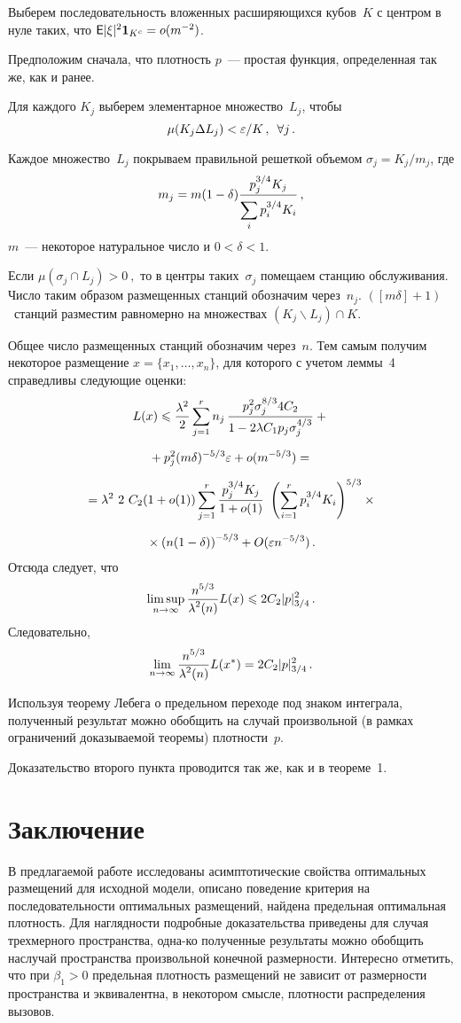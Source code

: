 \begin{multicols}{2}
Выберем последовательность вложенных расширяющихся кубов~$K$ с центром в нуле таких, что
${{\sf E}}|\xi|^2 \mathbf{1}_{K^c}=o(m^{-2})$.

Предположим сначала, что плотность $p$~--- прос\-тая функция, определенная так же, как и ранее.

Для каждого $K_j$ выберем элементарное множество~$L_j$, чтобы
$$
\mu(K_j \Delta L_j)<\varepsilon/K\,,\enskip \forall j\,.
$$

Каждое множество~$L_j$ покрываем правильной решеткой объемом
$\sigma_j=K_j/m_j$, где
$$
m_j=m(1-\delta) \displaystyle\frac{\displaystyle p_j^{3/4}K_j\mathstrut}{\displaystyle \sum\limits_{i}^{} p_i^{3/4}K_i\mathstrut}\,,
$$
$m$~--- некоторое натуральное число и $0<\delta<1$.

Если $\mu(\sigma_j\cap L_j)>0~,$ то в центры таких~$\sigma_j$ помещаем станцию
обслуживания. Число таким образом размещенных станций обозначим через~$n_j$. 
$([m\delta]+1)$~станций разместим равномерно на множествах $(K_j\backslash L_j)\cap K$.

Общее число размещенных станций обозначим через~$n$. Тем самым получим некоторое размещение
$x=\{x_1,\ldots,x_n\}$, для которого с учетом леммы~4 справедливы следующие оценки:
\begin{multline*}
L(x)\leqslant \displaystyle\frac{\displaystyle \lambda^2\mathstrut}{\displaystyle 2\mathstrut} \sum\limits_{j=1}^{r} n_j\, \displaystyle\frac{\displaystyle p_j^2 \sigma_j^{8/3} 4C_2\mathstrut}{\displaystyle 1-2\lambda C_1 p_j \sigma_j^{4/3}\mathstrut}+{}\\[6pt]
{}+ p_j^2 (m \delta)^{-5/3} \varepsilon +o(m^{-5/3}) ={}\\[6pt]
{}
=\lambda^2~ 2~ C_2(1+o(1))\sum\limits_{j=1}^{r} \displaystyle\frac{\displaystyle p_j^{3/4} K_j \mathstrut}{\displaystyle 1+o(1)\mathstrut}~
\left(\sum\limits_{i=1}^{r} p_i^{3/4} K_i\right)^{5/3}\times{}\\[6pt]
{}\times \left(n(1-\delta)\right)^{-5/3}+O(\varepsilon n^{-5/3})\,.
\end{multline*}
Отсюда следует, что
$$
\limsup\limits_{n \to \infty}\displaystyle\frac{\displaystyle n^{5/3}\mathstrut}{\displaystyle \lambda^2(n)\mathstrut}L(x)\leqslant 2C_2|p|_{3/4}^2\,.
$$
Следовательно,
$$
\lim\limits_{n\to\infty}\displaystyle\frac{\displaystyle n^{5/3}\mathstrut}{\displaystyle \lambda^2(n)\mathstrut}L(x^*)=2C_2|p|_{3/4}^2\,.
$$

Используя теорему Лебега о предельном переходе под знаком интеграла, 
полученный результат можно обобщить на случай произвольной (в рамках 
ограничений доказываемой теоремы) плотности~$p$.

Доказательство второго пункта проводится так же, как и в теореме~1.

\section{Заключение}

В предлагаемой работе исследованы асимптотические свойства оптимальных 
размещений для исходной модели, описано поведение критерия на последовательности 
оптимальных размещений, найдена предельная оптимальная плотность. Для наглядности 
подробные доказательства приведены для случая трехмерного пространства, одна-\linebreak ко 
полученные результаты можно обобщить на\linebreak случай пространства произвольной конечной 
раз\-мер\-ности. Интересно отметить, что при $\beta_1 >0$ предельная плотность 
размещений не зависит от размерности пространства и эквивалентна, в некотором 
смысле, плотности распределения вызовов.


\end{multicols}
